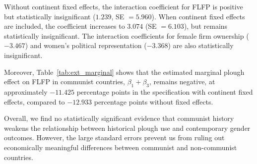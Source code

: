 \documentclass[12pt,a4paper]{article}
\begin{document}
Without continent fixed effects, the interaction coefficient for FLFP is positive but statistically insignificant ($1.239$, SE $=5.960$). When continent fixed effects are
included, the coefficient increases to $3.074$ (SE $=6.103$), but remains statistically insignificant. The interaction coefficients for female firm ownership ($-3.467$) and women's political representation ($-3.368$) are also statistically insignificant.

Moreover, Table~\ref{tab:ext_marginal} shows that the estimated marginal plough effect on FLFP in communist countries, $\beta_1+\beta_3$, remains negative, at approximately $-11.425$ percentage points in the specification with continent fixed effects, compared to $-12.933$ percentage points without fixed effects.

Overall, we find no statistically significant evidence that communist history weakens the relationship between historical plough use and contemporary gender outcomes. However, the large standard errors prevent us from ruling out economically meaningful differences between communist and non-communist countries.
\end{document}

